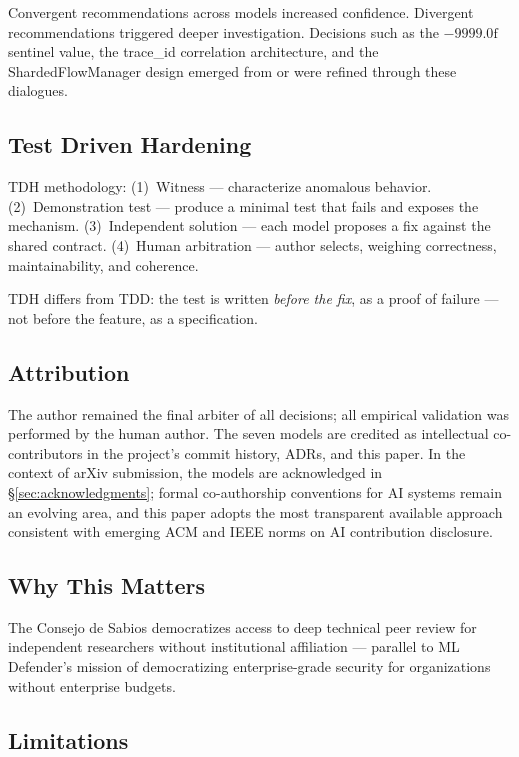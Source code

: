 \documentclass[11pt,a4paper]{article}
\begin{document}
Convergent recommendations across models increased confidence. Divergent recommendations
triggered deeper investigation. Decisions such as the $-9999.0\text{f}$ sentinel value, the
trace\_id correlation architecture, and the ShardedFlowManager design emerged from or were
refined through these dialogues.

\subsection{Test Driven Hardening}

TDH methodology: (1)~Witness --- characterize anomalous behavior. (2)~Demonstration test ---
produce a minimal test that fails and exposes the mechanism. (3)~Independent solution ---
each model proposes a fix against the shared contract. (4)~Human arbitration --- author
selects, weighing correctness, maintainability, and coherence.

TDH differs from TDD: the test is written \emph{before the fix}, as a proof of failure ---
not before the feature, as a specification.

\subsection{Attribution}

The author remained the final arbiter of all decisions; all empirical validation was
performed by the human author. The seven models are credited as intellectual co-contributors
in the project's commit history, ADRs, and this paper. In the context of arXiv submission,
the models are acknowledged in \S\ref{sec:acknowledgments}; formal co-authorship conventions
for AI systems remain an evolving area, and this paper adopts the most transparent available
approach consistent with emerging ACM and IEEE norms on AI contribution disclosure.

\subsection{Why This Matters}

The Consejo de Sabios democratizes access to deep technical peer review for independent
researchers without institutional affiliation --- parallel to ML Defender's mission of
democratizing enterprise-grade security for organizations without enterprise budgets.

\subsection{Limitations}
\end{document}
